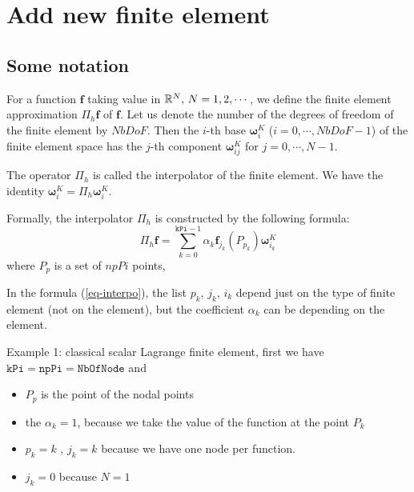 \section{Add new finite element}

\subsection{Some notation}
\def\Fb#1{\boldsymbol{\omega}^{K}_{#1}}
\def\fbi{\mathbf{\omega}^{K}_{ij}}


For a function $\boldsymbol{f}$ taking value in $\mathbb{R}^{N},\,
N=1,2,\cdots$, we define the finite element approximation $\Pi_h
\boldsymbol{f}$ of $\boldsymbol{f}$. Let us denote the number of the
degrees of freedom of the finite element by $NbDoF$. Then the $i$-th
base  $\boldsymbol{\omega}^{K}_{i}$ ($i=0,\cdots,NbDoF-1$) of the
finite element space has the $j$-th component
$\mathbf{\omega}^{K}_{ij}$ for $j=0,\cdots,N-1$.

The operator  $\Pi_{h}$ is called the interpolator of the finite element.
We have the identity $\boldsymbol{\omega}^{K}_{i} =  \Pi_{h} \boldsymbol{\omega}^{K}_{i} $.

Formally, the interpolator $\Pi_{h}$ is constructed by the following formula:
\begin{equation}
\label{eq-interpo}
\Pi_{h} \boldsymbol{f} = \sum_{k=0}^{\mathtt{kPi}-1} \alpha_k \boldsymbol{f}_{j_{k}}(P_{p_{k}}) \boldsymbol{\omega}^{K}_{i_{k}}
\end{equation}
where $P_{p}$ is a set of $npPi$ points,

In the formula (\ref{eq-interpo}), the list $ p_{k},\, j_{k},\, i_{k}$ depend just on  the type of finite element (not on the element), but the coefficient  $\alpha_{k}$ can be depending on the element.

\medskip
 Example 1: classical scalar  Lagrange finite element, first we have $\mathtt{kPi}=\mathtt{npPi}=\mathtt{NbOfNode}$ and
\begin{itemize}
\item $P_{p}$ is the point of the nodal points
\item  the $\alpha_k=1$, because we take the value  of the function at the point $P_{k}$
\item $p_{k}=k$ ,  $j_{k}=k$ because we have one node per  function.
\item $j_{k}=0$ because $N=1$
\end{itemize}

